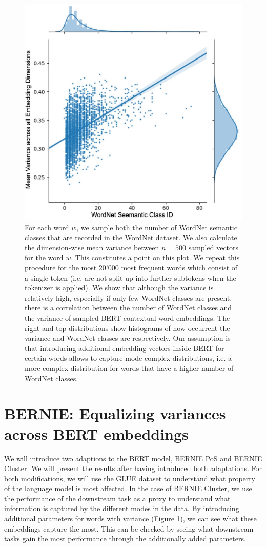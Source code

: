 \documentclass[a4paper,12pt,oneside,openright]{report}
\begin{document}
\begin{figure}[H]
	\center
  \includegraphics[width=0.45\linewidth]{./assets/experiments/variance_in_BERT_embeddings.jpg}
  \caption{
  	For each word $w$, we sample both the number of WordNet semantic classes that are recorded in the WordNet dataset. We also calculate the dimension-wise mean variance between $n=500$ sampled vectors for the word $w$. 
  	This constitutes a point on this plot.
  	We repeat this procedure for the most 20'000 most frequent words which consist of a single token (i.e. are not split up into further subtokens when the tokenizer is applied).
	We show that although the variance is relatively high, especially if only few WordNet classes are present, there is a correlation between the number of WordNet classes and the variance of sampled BERT contextual word embeddings.
	The right and top distributions show histograms of how occurrent the variance and WordNet classes are respectively.
	Our assumption is that introducing additional embedding-vectors inside BERT for certain words allows to capture mode complex distributions, i.e. a more complex distribution for words that have a higher number of WordNet classes.
  }
  \label{fig:BERT_variance}
\end{figure}

\section{BERNIE: Equalizing variances across BERT embeddings}

We will introduce two adaptions to the BERT model, BERNIE PoS and BERNIE Cluster.
We will present the results after having introduced both adaptations.
For both modifications, we will use the GLUE dataset to understand what property of the language model is most affected.
In the case of BERNIE Cluster, we use the performance of the downstream task as a proxy to understand what information is captured by the different modes in the data. 
By introducing additional parameters for words with variance (Figure \ref{fig:BERT_variance}), we can see what these embeddings capture the most.
This can be checked by seeing what downstream tasks gain the most performance through the additionally added parameters.
\end{document}
